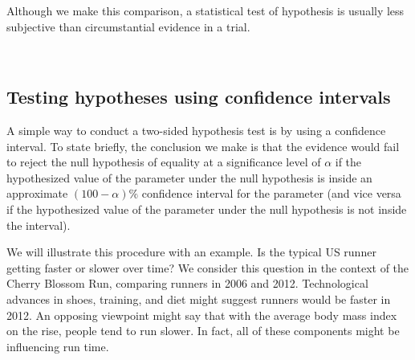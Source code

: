 Although we make this comparison, a statistical test of hypothesis is usually less subjective than 
circumstantial evidence in a trial.


\vfill










\hfill\\
\subsection{Testing hypotheses using confidence intervals}
\label{utilizingOurCI}

A simple way to conduct a two-sided hypothesis test is by using a confidence interval. 
To state briefly, the conclusion we make is that the evidence would fail to reject
the null hypothesis of equality at a significance level of $\alpha$ if the hypothesized value
of the parameter under the null hypothesis is inside an approximate $(100-\alpha)\%$ confidence
interval for the parameter (and vice versa if the hypothesized value of the parameter under the null 
hypothesis is not inside the interval).

We will illustrate this procedure with an example.
Is the typical US runner getting faster or slower over time? We consider this question in the context of the Cherry Blossom Run, comparing runners in 2006 and 2012. Technological advances in shoes, training, and diet might suggest runners would be faster in 2012. An opposing viewpoint might say that with the average body mass index on the rise, people tend to run slower. In fact, all of these components might be influencing run time.

